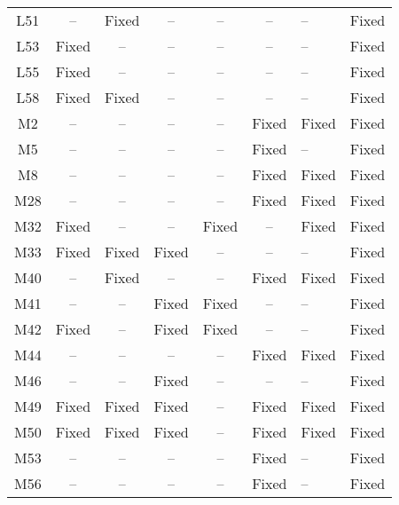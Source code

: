 \begin{table}[!t]
{\begin{tabular}{|c|c|c|c|c|c|}
L51               & --        & Fixed     & --        & --        & --        & --        &Fixed   \\
L53               & Fixed     & --        & --        & --        & --        & --        &Fixed   \\
L55               & Fixed     & --        & --        & --        & --        & --        &Fixed   \\
L58               & Fixed     & Fixed     & --        & --        & --        & --        &Fixed   \\
\hline
M2                & --        & --        & --        & --        & Fixed     & Fixed     &Fixed   \\
M5                & --        & --        & --        & --        & Fixed     & --        &Fixed   \\
M8                & --        & --        & --        & --        & Fixed     & Fixed     &Fixed   \\
M28               & --        & --        & --        & --        & Fixed     & Fixed     &Fixed   \\
M32               & Fixed     & --        & --        & Fixed     & --        & Fixed     &Fixed   \\
M33               & Fixed     & Fixed     & Fixed     & --        & --        & --        &Fixed   \\
M40               & --        & Fixed     & --        & --        & Fixed     & Fixed     &Fixed   \\
M41               & --        & --        & Fixed     & Fixed     & --        & --        &Fixed   \\
M42               & Fixed     & --        & Fixed     & Fixed     & --        & --        &Fixed   \\
M44               & --        & --        & --        & --        & Fixed     & Fixed     &Fixed   \\
M46               & --        & --        & Fixed     & --        & --        & --        &Fixed   \\
M49               & Fixed     & Fixed     & Fixed     & --        & Fixed     & Fixed     &Fixed   \\
M50               & Fixed     & Fixed     & Fixed     & --        & Fixed     & Fixed     &Fixed   \\
M53               & --        & --        & --        & --        & Fixed     & --        &Fixed   \\
M56               & --        & --        & --        & --        & Fixed     & --        &Fixed   \\

\end{tabular}}
\end{table}
